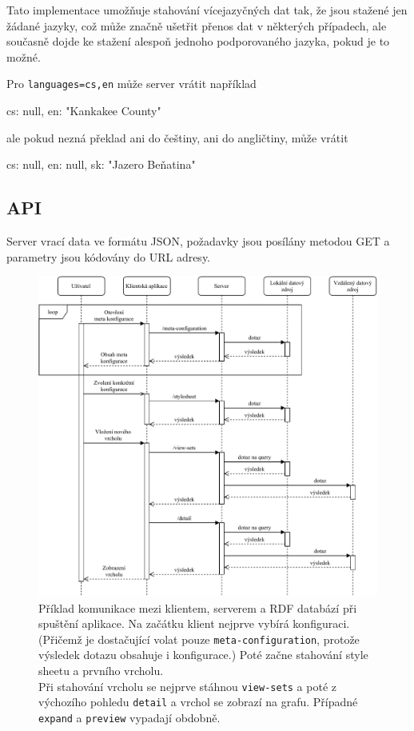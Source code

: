 Tato implementace umožňuje stahování vícejazyčných dat tak, že jsou stažené jen žádané jazyky, což může značně ušetřit přenos dat v některých případech, ale současně dojde ke stažení alespoň jednoho podporovaného jazyka, pokud je to možné.

\begin{prikl}
Pro \texttt{languages=cs,en} může server vrátit například
\begin{code}[frame=none]
{
    cs: null,
    en: "Kankakee County"
}
\end{code}
ale pokud nezná překlad ani do češtiny, ani do angličtiny, může vrátit
\begin{code}[frame=none]
{
    cs: null,
    en: null,
    sk: "Jazero Beňatina"
}
\end{code}
\end{prikl}

\subsection{API}
Server vrací data ve formátu JSON, požadavky jsou posílány metodou GET a parametry jsou kódovány do URL adresy.

\begin{figure}[p]
    \centering
    \includegraphics[width=\textwidth]{media/sequence-server.pdf}
    \caption{Příklad komunikace mezi klientem, serverem a RDF databází při spuštění aplikace. Na začátku klient nejprve vybírá konfiguraci. (Přičemž je dostačující volat pouze \texttt{meta-configuration}, protože výsledek dotazu obsahuje i konfigurace.) Poté začne stahování style sheetu a prvního vrcholu. \\ Při stahování vrcholu se nejprve stáhnou \texttt{view-sets} a poté z výchozího pohledu \texttt{detail} a vrchol se zobrazí na grafu. Případné \texttt{expand} a \texttt{preview} vypadají obdobně.}
\end{figure}

